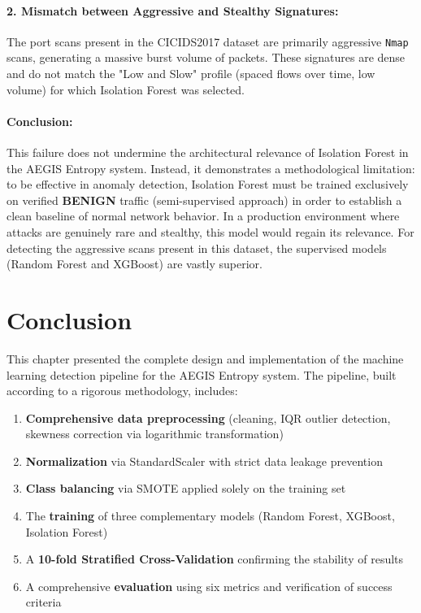 \paragraph{2. Mismatch between Aggressive and Stealthy Signatures:} The port scans present in the CICIDS2017 dataset are primarily aggressive \texttt{Nmap} scans, generating a massive burst volume of packets. These signatures are dense and do not match the "Low and Slow" profile (spaced flows over time, low volume) for which Isolation Forest was selected.

\paragraph{Conclusion:} This failure does not undermine the architectural relevance of Isolation Forest in the AEGIS Entropy system. Instead, it demonstrates a methodological limitation: to be effective in anomaly detection, Isolation Forest must be trained exclusively on verified \textbf{BENIGN} traffic (semi-supervised approach) in order to establish a clean baseline of normal network behavior. In a production environment where attacks are genuinely rare and stealthy, this model would regain its relevance. For detecting the aggressive scans present in this dataset, the supervised models (Random Forest and XGBoost) are vastly superior.

\section{Conclusion}

This chapter presented the complete design and implementation of the machine learning detection pipeline for the AEGIS Entropy system. The pipeline, built according to a rigorous methodology, includes:

\begin{enumerate}
    \item \textbf{Comprehensive data preprocessing} (cleaning, IQR outlier detection, skewness correction via logarithmic transformation)
    \item \textbf{Normalization} via StandardScaler with strict data leakage prevention
    \item \textbf{Class balancing} via SMOTE applied solely on the training set
    \item The \textbf{training} of three complementary models (Random Forest, XGBoost, Isolation Forest)
    \item A \textbf{10-fold Stratified Cross-Validation} confirming the stability of results
    \item A comprehensive \textbf{evaluation} using six metrics and verification of success criteria
\end{enumerate}

